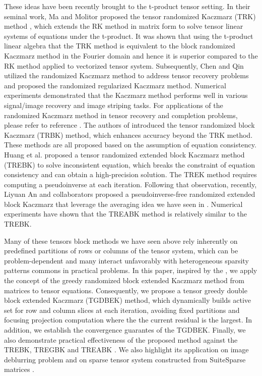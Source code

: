 \documentclass[11pt]{article}
\begin{document}
These ideas have been recently brought to the t-product tensor setting. In their seminal work, Ma and Molitor \cite{molitor2022} proposed  the tensor randomized Kaczmarz (TRK) method , which extends the RK method in matrix form to solve tensor linear systems of equations under the t-product. It was shown that using the t-product linear algebra that the TRK method  is equivalent to the block randomized Kaczmarz method in the Fourier domain and hence it is superior compared to the  RK  method applied to vectorized tensor system. Subsequently, Chen and Qin\cite{chen2021} utilized the randomized Kaczmarz method to address tensor recovery problems and proposed the randomized regularized Kaczmarz method. Numerical experiments demonstrated that the Kaczmarz method performs well in various signal/image recovery and image striping tasks. For applications of the randomized Kaczmarz method in tensor recovery and completion problems, please refer to reference \cite{chen2021,wang2022, wang2023, lia2024, zhang2024}. The authors of \cite{ba02020TRB} introduced the tensor randomized block Kaczmarz (TRBK) method, which enhances accuracy beyond the TRK method. These methods are all proposed based on the assumption of equation consistency. Huang et al. \cite{huang2023TREK} proposed a tensor randomized extended block Kaczmarz method (TREBK) to solve inconsistent equation, which breaks the constraint of equation consistency and can obtain a high-precision solution. The TREK method requires computing a pseudoinverse at each iteration. Following that observation, recently,  Liyuan An and collaborators \cite{lian2024TREABK} proposed a pseudoinverse-free randomized extended block Kaczmarz that  leverage the averaging idea  we have seen in \cite{necoara2019faste, du2020rando}. Numerical experiments have shown that the TREABK method is relatively similar to the TREBK. 

Many of these tensors block methods we have seen above \cite{lian2024TREABK, ba02020TRB} rely inherently on predefined partitions of  rows or columns of the tensor system, which can be problem-dependent and many interact unfavorably with heterogeneous sparsity patterns commons in practical problems.  In this paper, inspired by the \cite{su2025}, we apply the concept of the greedy randomized block  extended Kaczmarz method
from matrices to tensor equations. Consequently,  we propose a tensor greedy double block extended Kaczmarz (TGDBEK) method, which dynamically builds active set for row and column slices at each iteration, avoiding fixed partitions and focusing  projection computation where the  the current residual is the largest. In addition, we establish the convergence guarantes of the TGDBEK. Finally, we also demonstrate practical effectiveness of the proposed method against the TREBK, TREGBK \cite{huang2023TREK} and TREABK \cite{su2025}. We also highlight its application on image deblurring problem and on sparse  tensor system constructed from  SuiteSparse matrices \cite{suiteSparse}.
\end{document}
